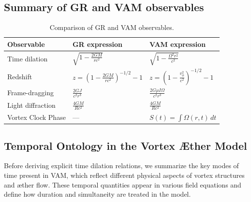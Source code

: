 \documentclass[preprint]{revtex4-2}
\begin{document}
\subsection*{Summary of GR and VAM observables}

\begin{table}[h!]
    \centering
    \begin{tabular}{lll}
        \toprule
        \textbf{Observable} & \textbf{GR expression} & \textbf{VAM expression} \\
        \midrule
        Time dilation & $\sqrt{1-\frac{2GM}{rc^2}}$ & $\sqrt{1-\frac{\Omega^2 r^2}{c^2}}$\\[0.5em]
        Redshift & $z=\left(1-\frac{2GM}{rc^2}\right)^{-1/2}-1$ & $z=\left(1-\frac{v_\phi^2}{c^2}\right)^{-1/2}-1$\\[0.5em]
        Frame-dragging & $\frac{2GJ}{c^2 r^3}$ & $\frac{2G\mu I\Omega}{c^2 r^3}$\\[0.5em]
        Light diffraction & $\frac{4GM}{Rc^2}$ & $\frac{4GM}{Rc^2}$\\
        Vortex Clock Phase & — & $S(t) = \int \Omega(r,t)\, dt$ \\
        \bottomrule
    \end{tabular}
    \caption{Comparison of GR and VAM observables.}
    \label{tab:equations}
\end{table}
\subsection*{Temporal Ontology in the Vortex Æther Model}

Before deriving explicit time dilation relations, we summarize the key modes of time present in VAM, which reflect different physical aspects of vortex structures and æther flow. These temporal quantities appear in various field equations and define how duration and simultaneity are treated in the model.
\end{document}
